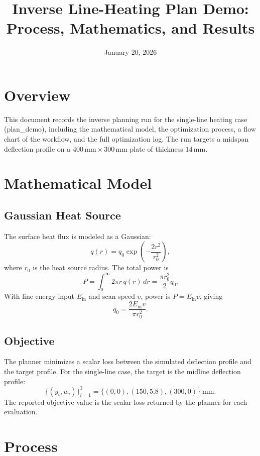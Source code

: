 \documentclass[11pt]{article}
\title{Inverse Line-Heating Plan Demo: Process, Mathematics, and Results}
\author{}
\date{January 20, 2026}
\begin{document}
\maketitle

\section{Overview}
This document records the inverse planning run for the single-line heating case (plan\_demo), including the mathematical model, the optimization process, a flow chart of the workflow, and the full optimization log. The run targets a midspan deflection profile on a $400\,\mathrm{mm} \times 300\,\mathrm{mm}$ plate of thickness $14\,\mathrm{mm}$.

\section{Mathematical Model}
\subsection{Gaussian Heat Source}
The surface heat flux is modeled as a Gaussian:
\begin{equation}
q(r) = q_0 \exp\left(-\frac{2 r^2}{r_0^2}\right),
\end{equation}
where $r_0$ is the heat source radius. The total power is
\begin{equation}
P = \int_0^{\infty} 2\pi r\, q(r)\, dr = \frac{\pi r_0^2}{2} q_0.
\end{equation}
With line energy input $E_{\mathrm{in}}$ and scan speed $v$, power is $P = E_{\mathrm{in}} v$, giving
\begin{equation}
q_0 = \frac{2 E_{\mathrm{in}} v}{\pi r_0^2}.
\end{equation}

\subsection{Objective}
The planner minimizes a scalar loss between the simulated deflection profile and the target profile. For the single-line case, the target is the midline deflection profile:
\begin{equation}
\{(y_i, w_i)\}_{i=1}^3 = \{(0, 0), (150, 5.8), (300, 0)\}~\mathrm{mm}.
\end{equation}
The reported objective value is the scalar loss returned by the planner for each evaluation.

\section{Process}
\end{document}
